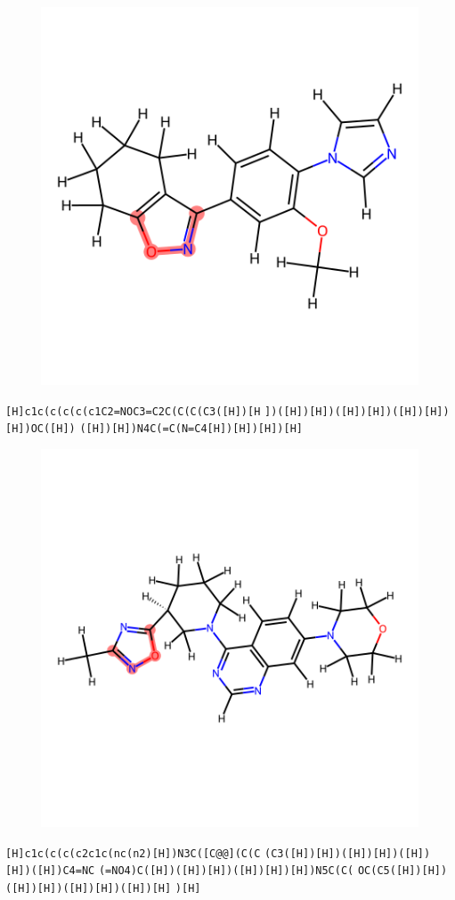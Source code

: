 \documentclass{article}
\begin{document}
\begin{figure}[ht]
\centering
    \includegraphics{mol144.png}
\end{figure}
\verb|[H]c1c(c(c(c(c1C2=NOC3=C2C(C(C(C3([H])[H| \verb|])([H])[H])([H])[H])([H])[H])[H])OC([H])| \verb|([H])[H])N4C(=C(N=C4[H])[H])[H])[H]|

\begin{figure}[ht]
\centering
    \includegraphics{mol145.png}
\end{figure}
\verb|[H]c1c(c(c(c2c1c(nc(n2)[H])N3C([C@@](C(C| \verb|(C3([H])[H])([H])[H])([H])[H])([H])C4=NC| \verb|(=NO4)C([H])([H])[H])([H])[H])[H])N5C(C(| \verb|OC(C5([H])[H])([H])[H])([H])[H])([H])[H]| \verb|)[H]|
\end{document}
